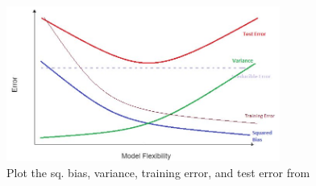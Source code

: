 \documentclass{kthreport}
\begin{document}
\begin{figure}[!h]
    \centering
    \includegraphics[width=0.8\textwidth]{figs/bias-var-trade.jpg}
    \caption{
        Plot the sq. bias, variance, training error, and test error
        from \cite{the-bias-variance-tradeoff}
    }
    \label{fig:bias-vars-tradeoff}
\end{figure}

\pagebreak



\end{document}
